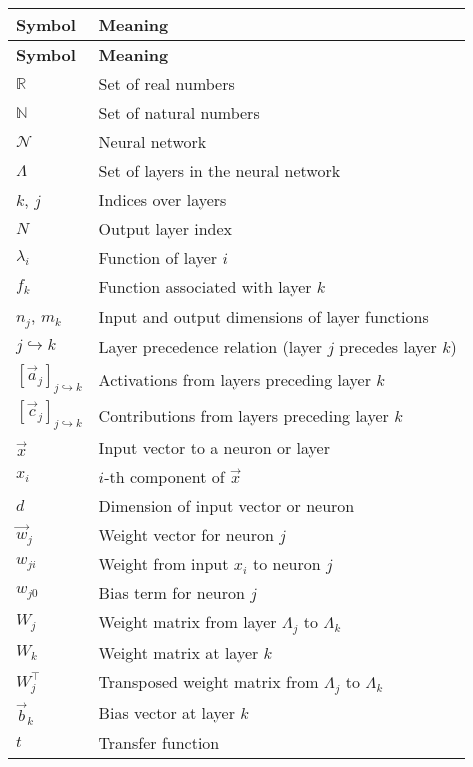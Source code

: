 \documentclass[12pt]{muthesis}
\newcommand{\NN}{\mathcal{N}}
\newcommand{\passto}{\hookrightarrow}
\theoremstyle{definition}
\begin{document}

\begin{longtable}{p{} p{}}

    \hline
    \textbf{Symbol} & \textbf{Meaning} \\
    \hline
    \endfirsthead

    \hline
    \textbf{Symbol} & \textbf{Meaning} \\
    \hline
    \endhead
    \endfoot
    \endlastfoot

$\mathbb{R}$ & Set of real numbers \\
$\mathbb{N}$ & Set of natural numbers \\
$\NN$ & Neural network \\
$\Lambda$ & Set of layers in the neural network \\
$k$, $j$ & Indices over layers \\
$N$ & Output layer index \\
$\lambda_i$ & Function of layer $i$ \\
$f_k$ & Function associated with layer $k$ \\
$n_j$, $m_k$ & Input and output dimensions of layer functions \\
$j \passto k$ & Layer precedence relation (layer $j$ precedes layer $k$) \\
$[\vec{a}_j]_{j \passto k}$ & Activations from layers preceding layer $k$ \\
$[\vec{c}_j]_{j \passto k}$ & Contributions from layers preceding layer $k$ \\
$\vec{x}$ & Input vector to a neuron or layer \\
$x_i$ & $i$-th component of $\vec{x}$ \\
$d$ & Dimension of input vector or neuron \\
$\vec{w}_j$ & Weight vector for neuron $j$ \\
$w_{ji}$ & Weight from input $x_i$ to neuron $j$ \\
$w_{j0}$ & Bias term for neuron $j$ \\
$W_j$ & Weight matrix from layer $\Lambda_j$ to $\Lambda_k$ \\
$W_k$ & Weight matrix at layer $k$ \\
$W_j^\intercal$ & Transposed weight matrix from $\Lambda_j$ to $\Lambda_k$ \\
$\vec{b}_k$ & Bias vector at layer $k$ \\
$t$ & Transfer function \\

\end{longtable}
\end{document}
